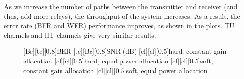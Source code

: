 As we increase the number of paths between the transmitter and receiver (and thus, add more relays), the throughput of the system increases.  As a result, the error rate (BER and WER) performance improves, as shown in the plots.  TU channels and HT channels give very similar results.

\begin{figure}
    [Bc][tc][0.8]{BER}
    [tc][Bc][0.8]{SNR (dB)}
    [cl][cl][0.5]{hard, constant gain allocation}
    [cl][cl][0.5]{hard, equal power allocation}
    [cl][cl][0.5]{soft, constant gain allocation}
    [cl][cl][0.5]{soft, equal power allocation}

\centerline{
	 \\
}
\centerline{
}
\end{figure}
